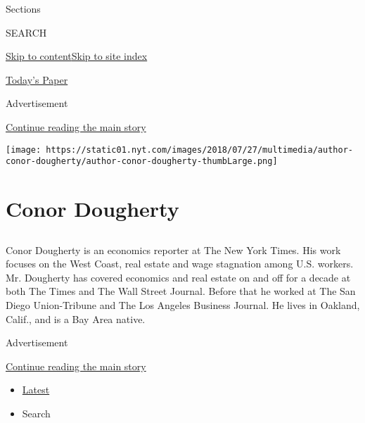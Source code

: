 Sections

SEARCH

\protect\hyperlink{site-content}{Skip to
content}\protect\hyperlink{site-index}{Skip to site index}

\href{https://myaccount.nytimes.com/auth/login?response_type=cookie\&client_id=vi}{}

\href{https://www.nytimes.com/section/todayspaper}{Today's Paper}

Advertisement

\protect\hyperlink{after-top}{Continue reading the main story}

\texttt{[image: https://static01.nyt.com/images/2018/07/27/multimedia/author-conor-dougherty/author-conor-dougherty-thumbLarge.png]}

\hypertarget{conor-dougherty}{%
\section{Conor Dougherty}\label{conor-dougherty}}

\hypertarget{section}{%
\subsection{}\label{section}}

Conor Dougherty is an economics reporter at The New York Times. His work
focuses on the West Coast, real estate and wage stagnation among U.S.
workers. Mr. Dougherty has covered economics and real estate on and off
for a decade at both The Times and The Wall Street Journal. Before that
he worked at The San Diego Union-Tribune and The Los Angeles Business
Journal. He lives in Oakland, Calif., and is a Bay Area native.

Advertisement

\protect\hyperlink{after-mid1}{Continue reading the main story}

\begin{itemize}
\tightlist
\item
  \protect\hyperlink{stream-panel}{Latest}
\item
  Search
\end{itemize}

